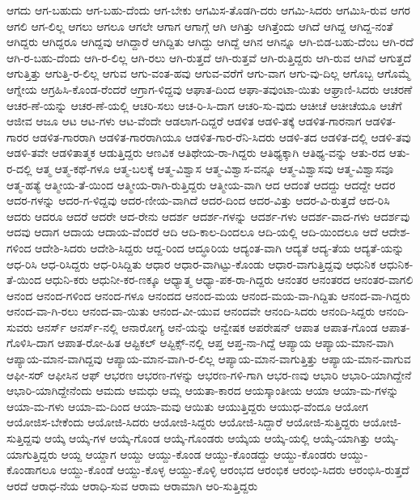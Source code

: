 {ಆಗದು
ಆಗ-ಬಹುದು
ಆಗ-ಬಹು-ದೆಂದು
ಆಗ-ಬೇಕು
ಆಗಮಿಸ-ತೊಡಗಿ-ದರು
ಆಗಮಿ-ಸಿದರು
ಆಗಮಿಸಿ-ರುವ
ಆಗರ
ಆಗಲಿ
ಆಗ-ಲಿಲ್ಲ
ಆಗಲು
ಆಗಲೂ
ಆಗಲೇ
ಆಗಾಗ
ಆಗಾಗ್ಗೆ
ಆಗಿ
ಆಗಿತ್ತು
ಆಗಿತ್ತೆಂದು
ಆಗಿದೆ
ಆಗಿದ್ದ
ಆಗಿದ್ದ-ನಂತೆ
ಆಗಿದ್ದರು
ಆಗಿದ್ದರೂ
ಆಗಿದ್ದವು
ಆಗಿದ್ದಾರೆ
ಆಗಿದ್ದಿತು
ಆಗಿದ್ದು
ಆಗಿದ್ದೆ
ಆಗಿನ
ಆಗಿನ್ನೂ
ಆಗಿ-ಬಿಡ-ಬಹು-ದೆಂಬ
ಆಗಿ-ರದೆ
ಆಗಿ-ರ-ಬಹು-ದೆಂದು
ಆಗಿ-ರ-ಲಿಲ್ಲ
ಆಗಿ-ರಲು
ಆಗಿ-ರುತ್ತದೆ
ಆಗಿ-ರುತ್ತವೆ
ಆಗಿ-ರುತ್ತಿದ್ದರು
ಆಗಿ-ರುವ
ಆಗಿವೆ
ಆಗುತ್ತದೆ
ಆಗುತ್ತಿತ್ತು
ಆಗುತ್ತಿ-ರ-ಲಿಲ್ಲ
ಆಗುವ
ಆಗು-ವಂತ-ಹವು
ಆಗುವ-ವರೆಗೆ
ಆಗು-ವಾಗ
ಆಗು-ವು-ದಿಲ್ಲ
ಆಗೊಬ್ಬ
ಆಗೊಮ್ಮೆ
ಆಗ್ನೇಯ
ಆಗ್ರಹಿಸಿ-ಕೊಂಡ-ರೆಂದರೆ
ಆಗ್ರಾಗ-ಳಿದ್ದವು
ಆಘಾತ-ದಿಂದ
ಆಘಾ-ತವುಂಟಾ-ಯಿತು
ಆಘ್ರಾಣಿ-ಸಿದರು
ಆಚರಣೆ
ಆಚರ-ಣೆ-ಯನ್ನು
ಆಚರ-ಣೆ-ಯಲ್ಲಿ
ಆಚರಿ-ಸಲು
ಆಚ-ರಿ-ಸಿ-ದಾಗ
ಆಚರಿ-ಸು-ವುದು
ಆಚೀಚೆ
ಆಚೀಚೆಯೂ
ಆಚೆಗೆ
ಆಜೀವ
ಆಜೂ
ಆಟ
ಆಟ-ಗಳು
ಆಟ-ವೆಂದೇ
ಆಡಲಾಗ-ದಿದ್ದರೆ
ಆಡಳಿತ
ಆಡಳಿ-ತಕ್ಕೆ
ಆಡಳಿತ-ಗಾರನಾಗ
ಆಡಳಿತ-ಗಾರರ
ಆಡಳಿತ-ಗಾರರಾಗಿ
ಆಡಳಿತ-ಗಾರರಾಗಿಯೂ
ಆಡಳಿತ-ಗಾರ-ರೆನಿ-ಸಿದರು
ಆಡಳಿ-ತದ
ಆಡಳಿತ-ದಲ್ಲಿ
ಆಡಳಿ-ತವು
ಆಡಳಿ-ತವೇ
ಆಡಳಿತಾತ್ಮಕ
ಆಡುತ್ತಿದ್ದರು
ಆಣವಿಕ
ಆತಿಥೇಯ-ರಾ-ಗಿದ್ದರು
ಆತಿಥ್ಯಕ್ಕಾಗಿ
ಆತಿಥ್ಯ-ವನ್ನು
ಆತು-ರದ
ಆತು-ರ-ದಲ್ಲಿ
ಆತ್ಮ
ಆತ್ಮ-ಕಥೆ-ಗಳೂ
ಆತ್ಮ-ಬಲಕ್ಕೆ
ಆತ್ಮ-ವಿಶ್ವಾಸ
ಆತ್ಮ-ವಿಶ್ವಾಸ-ವನ್ನೂ
ಆತ್ಮ-ವಿಶ್ವಾಸವು
ಆತ್ಮ-ವಿಶ್ವಾಸವೂ
ಆತ್ಮ-ಹತ್ಯೆ
ಆತ್ಮೀಯ-ತೆ-ಯಿಂದ
ಆತ್ಮೀಯ-ರಾಗಿ-ರುತ್ತಿದ್ದರು
ಆತ್ಮೀಯ-ವಾಗಿ
ಆದ
ಆದಂತೆ
ಆದದ್ದು
ಆದದ್ದೇ
ಆದರ
ಆದರ-ಗಳನ್ನು
ಆದರ-ಗ-ಳಿದ್ದವು
ಆದರ-ಣೀಯ-ವಾಗಿದೆ
ಆದರ-ದಿಂದ
ಆದರ-ವಿತ್ತು
ಆದರ-ವಿ-ರುತ್ತದೆ
ಆದ-ರಿಸಿ
ಆದರು
ಆದರೂ
ಆದರೆ
ಆದರೇ
ಆದ-ರೇನು
ಆದರ್ಶ
ಆದರ್ಶ-ಗಳನ್ನು
ಆದರ್ಶ-ಗಳು
ಆದರ್ಶ-ವಾದ-ಗಳು
ಆದರ್ಶವು
ಆದವು
ಆದಾಗ
ಆದಾಯ
ಆದಾಯ-ವೆಂದರೆ
ಆದಿ
ಆದಿ-ಕಾಲ-ದಿಂದಲೂ
ಆದಿ-ಯಲ್ಲಿ
ಆದಿ-ಯಿಂದಲೂ
ಆದೆ
ಆದೇಶ-ಗಳಿಂದ
ಆದೇಶಿ-ಸಿದರು
ಆದೇಶಿ-ಸಿದ್ದರು
ಆದ್ದ-ರಿಂದ
ಆದ್ಧೂರಿಯ
ಆದ್ಯಂತ-ವಾಗಿ
ಆದ್ಯತೆ
ಆದ್ಯ-ತೆಯ
ಆದ್ಯತೆ-ಯನ್ನು
ಆಧ-ರಿಸಿ
ಆಧ-ರಿಸಿದ್ದರು
ಆಧ-ರಿಸಿದ್ದಿತು
ಆಧಾರ
ಆಧಾರ-ವಾಗಿಟ್ಟು-ಕೊಂಡು
ಆಧಾರ-ವಾಗುತ್ತಿದ್ದವು
ಆಧುನಿಕ
ಆಧುನಿಕ-ತೆ-ಯಿಂದ
ಆಧುನಿ-ಕರು
ಆಧುನೀ-ಕರ-ಣಕ್ಕೂ
ಆಧ್ಯಾತ್ಮ
ಆಧ್ಯಾ-ಪಕ-ರಾ-ಗಿದ್ದರು
ಆನಂತರ
ಆನಂತರದ
ಆನಂತರ-ವಾಗಲಿ
ಆನಂದ
ಆನಂದ-ಗಳಿಂದ
ಆನಂದ-ಗಳೂ
ಆನಂದದ
ಆನಂದ-ಮಯ
ಆನಂದ-ಮಯ-ವಾ-ಗಿದ್ದಿತು
ಆನಂದ-ವಾ-ಗಿದ್ದರು
ಆನಂದ-ವಾ-ಗಿ-ರಲು
ಆನಂದ-ವಾ-ಯಿತು
ಆನಂದ-ವೀ-ಯುವ
ಆನಂದವೇ
ಆನಂದಿ-ಸಿದರು
ಆನಂದಿ-ಸಿದ್ದರು
ಆನಂದಿ-ಸುವರು
ಆನರ್ಸ್
ಆನರ್ಸ್-ನಲ್ಲಿ
ಆನಾರೋಗ್ಯ
ಆನೆ-ಯನ್ನು
ಆನ್ವೇಷಕ
ಆಪರೇಷನ್
ಆಪಾತ
ಆಪಾತ-ಗೊಂಡ
ಆಪಾತ-ಗೊಳಿಸಿ-ದಾಗ
ಆಪಾತ-ರೋ-ಹಿತ
ಆಪ್ಟಿಕಲ್
ಆಪ್ಟಿಕ್ಸ್-ನಲ್ಲಿ
ಆಪ್ತ
ಆಪ್ತ-ನಾ-ಗಿದ್ದೆ
ಆಪ್ಯಾಯ
ಆಪ್ಯಾಯ-ಮಾನ-ವಾಗಿ
ಆಪ್ಯಾಯ-ಮಾನ-ವಾಗಿದ್ದವು
ಆಪ್ಯಾಯ-ಮಾನ-ವಾಗಿ-ರ-ಲಿಲ್ಲ
ಆಪ್ಯಾಯ-ಮಾನ-ವಾಗುತ್ತಿತ್ತು
ಆಪ್ಯಾಯ-ಮಾನ-ವಾಗುವ
ಆಫೀ-ಸರ್
ಆಫೀಸಿನ
ಆಫ್
ಆಭರಣ
ಆಭರಣ-ಗಳನ್ನು
ಆಭರಣ-ಗಳಿ-ಗಾಗಿ
ಆಭರ-ಣವು
ಆಭಾರಿ
ಆಭಾರಿ-ಯಾಗಿದ್ದೇನೆ
ಆಭಾರಿ-ಯಾಗಿದ್ದೇನೆಂದು
ಆಮದು
ಆಮಧು
ಆಮ್ಲ
ಆಯತಾ-ಕಾರದ
ಆಯಸ್ಕಾಂತೀಯ
ಆಯಾ
ಆಯಾ-ಮ-ಗಳನ್ನು
ಆಯಾ-ಮ-ಗಳು
ಆಯಾ-ಮ-ದಿಂದ
ಆಯಾ-ಮವು
ಆಯಿತು
ಆಯುತ್ತಿದ್ದರು
ಆಯುಧ-ವೆಂದೂ
ಆಯೋಗ
ಆಯೋಜಿಸ-ಬೇಕೆಂದು
ಆಯೋಜಿ-ಸಿದರು
ಆಯೋಜಿ-ಸಿದ್ದರು
ಆಯೋಜಿ-ಸಿದ್ದಾರೆ
ಆಯೋಜಿ-ಸುತ್ತಿದ್ದರು
ಆಯೋಜಿ-ಸುತ್ತಿದ್ದವು
ಆಯ್ಕೆ
ಆಯ್ಕೆ-ಗಳ
ಆಯ್ಕೆ-ಗೊಂಡ
ಆಯ್ಕೆ-ಗೊಂಡರು
ಆಯ್ಕೆಯ
ಆಯ್ಕೆ-ಯಲ್ಲಿ
ಆಯ್ಕೆ-ಯಾಗಿತ್ತು
ಆಯ್ಕೆ-ಯಾಗುತ್ತಿದ್ದರು
ಆಯ್ದ
ಆಯ್ದಾಗ
ಆಯ್ದು
ಆಯ್ದು-ಕೊಂಡ
ಆಯ್ದು-ಕೊಂಡದ್ದು
ಆಯ್ದು-ಕೊಂಡರು
ಆಯ್ದು-ಕೊಂಡಾಗಲೂ
ಆಯ್ದು-ಕೊಂಡೆ
ಆಯ್ದು-ಕೊಳ್ಳ
ಆಯ್ದು-ಕೊಳ್ಳಿ
ಆರಂಭದ
ಆರಂಭಿಕ
ಆರಂಭಿ-ಸಿದರು
ಆರಂಭಿಸಿ-ರುತ್ತದೆ
ಆರದೆ
ಆರಾಧ-ನೆಯ
ಆರಾಧಿ-ಸುವ
ಆರಾಮ
ಆರಾಮಾಗಿ
ಆರಿ-ಸುತ್ತಿದ್ದರು
}
